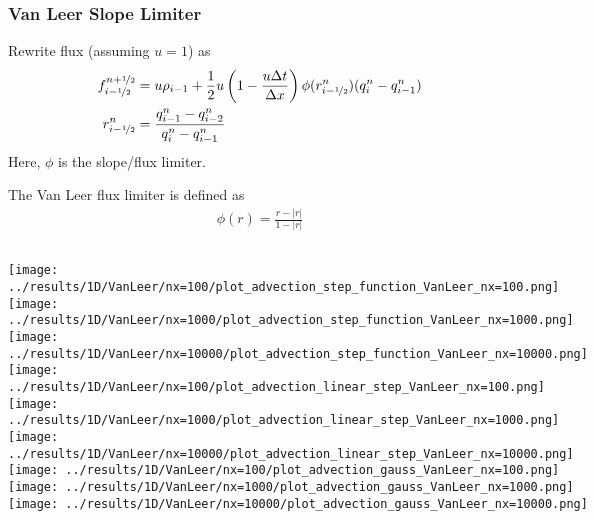 
\begin{frame}
	\frametitle{Van Leer Slope Limiter}
	Rewrite flux (assuming $u = 1$) as
	\begin{align*}
		f_{i-\nicefrac{1}{2}}^{n+\nicefrac{1}{2}} &= u \rho_{i-1} + \frac{1}{2} u \left( 1 - \frac{u\Delta t}{\Delta x} \right) \phi(r_{i-\nicefrac{1}{2}}^n) (q_i^n - q_{i-1}^n)\\
		r_{i-\nicefrac{1}{2}}^n &= \frac{q_{i-1}^n - q_{i-2}^n}{q_i^n - q_{i-1}^n}
	\end{align*}
	Here, $\phi$ is the slope/flux limiter.
	
	The Van Leer flux limiter is defined as
	\begin{align*}
		\phi(r) = \frac{r - |r|}{1 - |r|}
	\end{align*}
\end{frame}







\begin{frame}
	\vspace{10pt}
	\begin{columns}
			\centering
			\texttt{[image: ../results/1D/VanLeer/nx=100/plot\_advection\_step\_function\_VanLeer\_nx=100.png]}\\
			\texttt{[image: ../results/1D/VanLeer/nx=1000/plot\_advection\_step\_function\_VanLeer\_nx=1000.png]}\\
			\texttt{[image: ../results/1D/VanLeer/nx=10000/plot\_advection\_step\_function\_VanLeer\_nx=10000.png]}
			\centering
			\texttt{[image: ../results/1D/VanLeer/nx=100/plot\_advection\_linear\_step\_VanLeer\_nx=100.png]}\\
			\texttt{[image: ../results/1D/VanLeer/nx=1000/plot\_advection\_linear\_step\_VanLeer\_nx=1000.png]}\\
			\texttt{[image: ../results/1D/VanLeer/nx=10000/plot\_advection\_linear\_step\_VanLeer\_nx=10000.png]}
			\centering
			\texttt{[image: ../results/1D/VanLeer/nx=100/plot\_advection\_gauss\_VanLeer\_nx=100.png]}\\
			\texttt{[image: ../results/1D/VanLeer/nx=1000/plot\_advection\_gauss\_VanLeer\_nx=1000.png]}\\
			\texttt{[image: ../results/1D/VanLeer/nx=10000/plot\_advection\_gauss\_VanLeer\_nx=10000.png]}
	\end{columns}
\end{frame}


